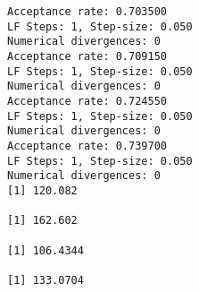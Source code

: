 \documentclass[11pt]{article}
\begin{document}
    \begin{Verbatim}[commandchars=\\\{\}]
Acceptance rate: 0.703500
LF Steps: 1, Step-size: 0.050
Numerical divergences: 0
Acceptance rate: 0.709150
LF Steps: 1, Step-size: 0.050
Numerical divergences: 0
Acceptance rate: 0.724550
LF Steps: 1, Step-size: 0.050
Numerical divergences: 0
Acceptance rate: 0.739700
LF Steps: 1, Step-size: 0.050
Numerical divergences: 0
[1] 120.082

[1] 162.602

[1] 106.4344

[1] 133.0704


    \end{Verbatim}

    \begin{center}
    \end{center}
    { \hspace*{\fill} \\}
    
\end{document}
